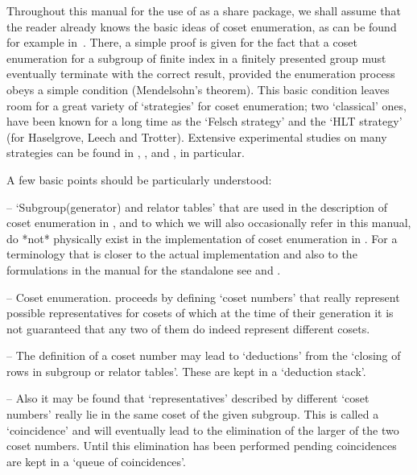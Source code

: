 
Throughout this manual for the use of {\ACE} as a {\GAP} share package,
we shall assume that the reader already knows the basic ideas of coset
enumeration,  as  can be  found  for  example in~\cite{Neu82}.  There,
a  simple  proof  is  given  for the fact that a coset enumeration for
a  subgroup  of  finite  index  in a  finitely  presented  group  must
eventually terminate with the correct result, provided the enumeration
process obeys  a simple  condition (Mendelsohn's theorem).  This basic
condition leaves room for a great variety of \lq strategies' for coset
enumeration; two \lq classical' ones, have been known for a long  time
as the \lq Felsch  strategy' and the \lq HLT strategy' (for Haselgrove,
Leech  and Trotter). Extensive experimental studies on many strategies
can  be  found  in \cite{CDHW73},  \cite{Hav91}, and  \cite{HR99},  in 
particular.

A few basic points  should be particularly understood:

\beginlist

\item{--} \lq Subgroup(generator) and relator tables' that are used in
the description of coset enumeration  in \cite{Neu82}, and to which we
will  also occasionally  refer in  this manual,   do  *not* physically
exist    in the implementation of  coset enumeration in {\ACE}.  For a
terminology that  is closer to  the actual implementation and  also to
the  formulations  in  the   manual  for  the  {\ACE}  standalone  see
\cite{CDHW73} and \cite{Hav91}.

\item{--} Coset  enumeration. proceeds  by defining \lq coset numbers' 
that really represent possible representatives for cosets of  which at
the time of their generation it is not guaranteed that any two of them
do indeed represent different cosets.

\item{--} The definition of a coset number may lead to \lq deductions'
from the \lq closing of rows in subgroup or relator tables'. These are
kept in a \lq deduction stack'.

\item{--}  Also it may be found that \lq representatives' described by
different \lq coset  numbers' really lie in the same coset of the given
subgroup. This is called a \lq coincidence' and will eventually lead to
the elimination  of the larger of  the two coset  numbers.  Until this
elimination  has been  performed pending  coincidences are  kept  in a
\lq queue of coincidences'.

